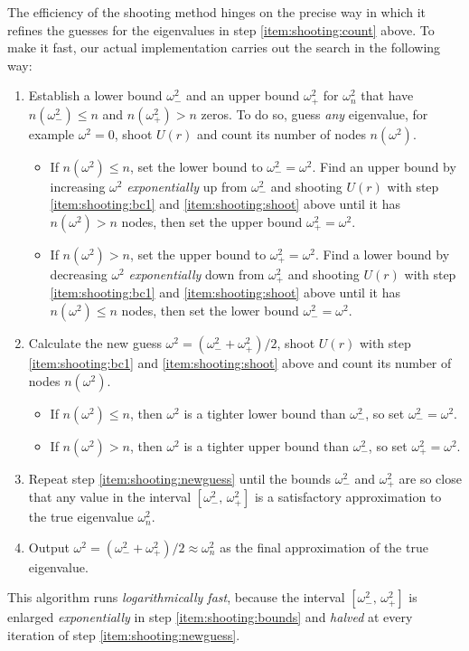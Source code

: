 The efficiency of the shooting method hinges on the precise way in which it refines the guesses for the eigenvalues in step \ref{item:shooting:count} above.
To make it fast, our actual implementation carries out the search in the following way:
\begin{enumerate}
\item Establish a lower bound $\omega_-^2$ and an upper bound $\omega_+^2$ for $\omega_n^2$ that have $n(\omega_-^2) \leq n$ and $n(\omega_+^2) > n$ zeros.
      To do so, guess \emph{any} eigenvalue, for example $\omega^2 = 0$, shoot $U(r)$ and count its number of nodes $n(\omega^2)$.
      \begin{itemize}
      \item If $n(\omega^2) \leq n$, set the lower bound to $\omega_-^2 = \omega^2$.
            Find an upper bound by increasing $\omega^2$ \emph{exponentially} up from $\omega_-^2$ and shooting $U(r)$ with step \ref{item:shooting:bc1} and \ref{item:shooting:shoot} above until it has $n(\omega^2) > n$ nodes, then set the upper bound $\omega_+^2 = \omega^2$.
      \item If $n(\omega^2) >    n$, set the upper bound to $\omega_+^2 = \omega^2$.
            Find a lower bound by decreasing $\omega^2$ \emph{exponentially} down from $\omega_+^2$ and shooting $U(r)$ with step \ref{item:shooting:bc1} and \ref{item:shooting:shoot} above until it has $n(\omega^2) \leq n$ nodes, then set the lower bound $\omega_-^2 = \omega^2$.
      \end{itemize}
      \label{item:shooting:bounds}
\item Calculate the new guess $\omega^2 = (\omega_-^2 + \omega_+^2) / 2$, shoot $U(r)$ with step \ref{item:shooting:bc1} and \ref{item:shooting:shoot} above and count its number of nodes $n(\omega^2)$. \label{item:shooting:newguess}
      \begin{itemize}
      \item If $n(\omega^2) \leq n$, then $\omega^2$ is a tighter lower bound than $\omega_-^2$, so set $\omega_-^2 = \omega^2$.
      \item If $n(\omega^2) >    n$, then $\omega^2$ is a tighter upper bound than $\omega_-^2$, so set $\omega_+^2 = \omega^2$.
      \end{itemize}
\item Repeat step \ref{item:shooting:newguess} until the bounds $\omega_-^2$ and $\omega_+^2$ are so close that any value in the interval $[\omega_-^2, \, \omega_+^2]$ is a satisfactory approximation to the true eigenvalue $\omega_n^2$.
\item Output $\omega^2 = (\omega_-^2 + \omega_+^2) / 2 \approx \omega_n^2$ as the final approximation of the true eigenvalue.
\end{enumerate}
This algorithm runs \emph{logarithmically fast}, because the interval $[\omega_-^2, \, \omega_+^2]$ is enlarged \emph{exponentially} in step \ref{item:shooting:bounds} and \emph{halved} at every iteration of step \ref{item:shooting:newguess}.

